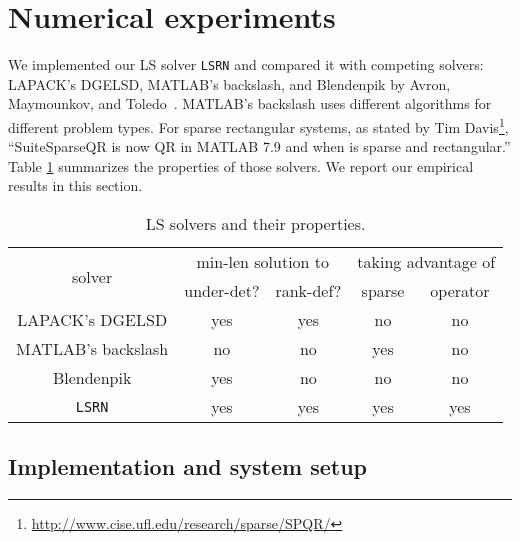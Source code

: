 \documentclass{siamltex}
\begin{document}
\section{Numerical experiments}
\label{sec:experiments}

We implemented our LS solver \texttt{LSRN} and compared it with
competing solvers: LAPACK's DGELSD, MATLAB's backslash, and Blendenpik by Avron,
Maymounkov, and Toledo~\cite{avron2010blendenpik}.  MATLAB's backslash uses
different algorithms for different problem types. For sparse rectangular
systems, as stated by Tim
Davis\footnote{\url{http://www.cise.ufl.edu/research/sparse/SPQR/}},
``SuiteSparseQR \cite{davis2006direct,davis2008algorithm} is now QR in MATLAB
7.9 and  when  is sparse and rectangular.''  Table
\ref{tab:lsq_solvers} summarizes the properties of those solvers.  We report our
empirical results in this section.

\begin{table}
  \centering
  \caption{LS solvers and their properties.}
  \begin{tabular}{c|c|c|c|c}
    \multirow{2}{*}{solver} & \multicolumn{2}{|c|}{min-len solution to} & \multicolumn{2}{|c}{taking advantage of} \\ 
    & under-det? & rank-def? & sparse  & operator  \\
    \hline
    LAPACK's DGELSD & yes & yes & no & no \\
    MATLAB's backslash & no & no & yes &  no \\
    Blendenpik & yes & no & no & no \\
    \texttt{LSRN} & yes & yes & yes & yes 
  \end{tabular}
  \label{tab:lsq_solvers}
\end{table}

\subsection{Implementation and system setup}
\end{document}
